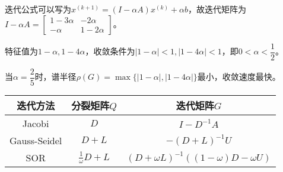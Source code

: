     \begin{solution}
        迭代公式可以写为$x^{(k+1)}=(I-\alpha A)x^{(k)}+\alpha b$，故迭代矩阵为$I-\alpha A=\begin{bmatrix}1-3\alpha&-2\alpha\\-\alpha &1-2\alpha\end{bmatrix}$。

        特征值为$1-\alpha,1-4\alpha$，收敛条件为$|1-\alpha|<1,|1-4\alpha|<1$，即$0<\alpha<\dfrac12$。

        当$\alpha=\dfrac25$时，谱半径$\rho(G)=\max\{|1-\alpha|,|1-4\alpha|\}$最小，收敛速度最快。
    \end{solution}


    \begin{theorem}[迭代方法的分裂矩阵和迭代矩阵]
        \begin{table}[H]
            \centering
            \begin{tabular}{|c|c|c|}
                \hline
                迭代方法 & 分裂矩阵$Q$ & 迭代矩阵$G$ \\
                \hline
                Jacobi & $D$ & $I-D^{-1}A$ \\
                \hline
                Gauss-Seidel & $D+L$ & $-(D+L)^{-1}U$ \\
                \hline
                SOR & $\tfrac1{\omega}D+L$ & $(D+\omega L)^{-1}((1-\omega)D-\omega U)$ \\
                \hline
            \end{tabular}
        \end{table}
    \end{theorem}


